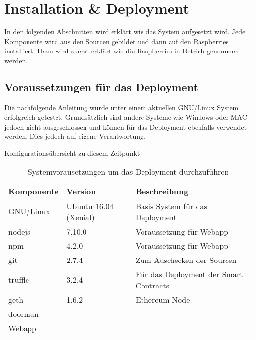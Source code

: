 \chapter{Installation \& Deployment}
\label{cha:Installation_Deployment}

In den folgenden Abschnitten wird erklärt wie das System aufgesetzt wird. Jede Komponente wird aus den Sourcen gebildet und dann auf den Raspberries installiert. Dazu wird zuerst erklärt wie die Raspberries in Betrieb genommen werden.

\section{Voraussetzungen für das Deployment}
Die nachfolgende Anleitung wurde unter einem aktuellen GNU/Linux System erfolgreich getestet. Grundsätzlich sind andere Systeme wie Windows oder MAC jedoch nicht ausgeschlossen und können für das Deployment ebenfalls verwendet werden. Dies jedoch auf eigene Verantwortung.

Konfigurationsübersicht zu diesem Zeitpunkt

\begin{table}[H]
\centering
\caption{Systemvorausetzungen um das Deployment durchzuführen}
\label{my-label}
\begin{tabular}{@{}lll@{}}
\toprule
Komponente 
& Version               
& Beschreibung                           
\\ \midrule
GNU/Linux  
& Ubuntu 16.04 (Xenial) 
& Basis System für das Deployment        
\\ \midrule
nodejs     
& 7.10.0                
& Voraussetzung für Webapp               
\\ \midrule
npm        
& 4.2.0                 
& Voraussetzung für Webapp               
\\ \midrule
git        
&  2.7.4                
& Zum Auschecken der Sourcen               
\\ \midrule
truffle    
& 3.2.4                 
& Für das Deployment der Smart Contracts 
\\ \midrule
geth       
& 1.6.2                 
& Ethereum Node                          
\\ \midrule
doorman    
&                       
&                           
\\ \midrule
Webapp     
&                       
&                                        
\\ \bottomrule
\end{tabular}
\end{table}

